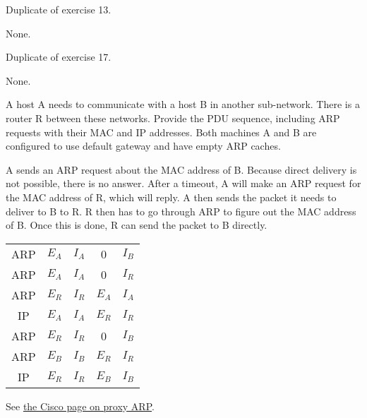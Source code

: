\begin{Exercise}
Duplicate of exercise 13.
\end{Exercise}
\begin{Answer}
None.
\end{Answer}

\begin{Exercise}
Duplicate of exercise 17.
\end{Exercise}
\begin{Answer}
None.
\end{Answer}

\begin{Exercise}
A host A needs to communicate with a host B in another sub-network.
There is a router R between these networks.
Provide the PDU sequence, including ARP requests with their MAC and IP addresses.
Both machines A and B are configured to use default gateway and have empty ARP caches.
\end{Exercise}
\begin{Answer}
A sends an ARP request about the MAC address of B.
Because direct delivery is not possible, there is no answer.
After a timeout, A will make an ARP request for the MAC address of R, which will reply.
A then sends the packet it needs to deliver to B to R.
R then has to go through ARP to figure out the MAC address of B.
Once this is done, R can send the packet to B directly.

\begin{center}
\begin{tabular}{c|c|c|c|c}
    ARP & \(E_A\) & \(I_A\) &       0 & \(I_B\) \\
    ARP & \(E_A\) & \(I_A\) &       0 & \(I_R\) \\
    ARP & \(E_R\) & \(I_R\) & \(E_A\) & \(I_A\) \\
    IP  & \(E_A\) & \(I_A\) & \(E_R\) & \(I_R\) \\
    ARP & \(E_R\) & \(I_R\) &       0 & \(I_B\) \\
    ARP & \(E_B\) & \(I_B\) & \(E_R\) & \(I_R\) \\
    IP  & \(E_R\) & \(I_R\) & \(E_B\) & \(I_B\) \\
\end{tabular}
\end{center}

See \href{https://www.cisco.com/c/en/us/support/docs/ip/dynamic-address-allocation-resolution/13718-5.html}{the Cisco page on proxy ARP}.
\end{Answer}

